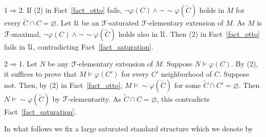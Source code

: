 \documentclass{amsproc}
\makeatletter
\newcommand{\mylabel}[1]{{#1}\hfill}
\renewenvironment{itemize}
  {\begin{list}{$\triangleright$}{%
  \setlength{\parskip}{0mm}
  \setlength{\topsep}{.1\baselineskip}
  \setlength{\rightmargin}{0mm}
  \setlength{\listparindent}{0mm}
  \setlength{\itemindent}{0mm}
  \setlength{\labelwidth}{3ex}
  \setlength{\itemsep}{.1\baselineskip}
  \setlength{\parsep}{.1\baselineskip}
  \setlength{\partopsep}{0mm}
  \setlength{\labelsep}{1ex}
  \setlength{\leftmargin}{\labelwidth+\labelsep}
  \let\makelabel\mylabel}}{%
\end{list}}
\newcounter{thm}
\theoremstyle{mio}
\newtheorem{fact}[thm]{Fact}\tcolorboxenvironment{fact}{mythm}
\providecommand{\proofNameStyle}{\bfseries}
\renewenvironment{proof}[1][\proofname]{\par
  \pushQED{\qed}%
  \normalfont%
  \trivlist
  \item[\hskip\labelsep
        \proofNameStyle
    #1\@addpunct{.}]\ignorespaces
}{%
  \popQED\endtrivlist\@endpefalse
}
\renewcommand*{\emph}[1]{%
   \smash{\tikz[baseline]\node[rectangle, fill=teal!25, rounded corners, inner xsep=0.5ex, inner ysep=0.2ex, anchor=base, minimum height = 2.7ex]{\strut #1};}}
\makeatother
\begin{document}
\begin{proof}
  1$\Rightarrow$2.
  If (2) in Fact~\ref{fact_otto} fails, $\neg\varphi(C)\wedge\neg\,{\sim}\varphi(\tilde C)$ holds in $M$ for every $\tilde C\cap C=\varnothing$.
  Let ${\EuScript U}$ be an ${\EuScript F}$-saturated ${\EuScript F}$-elementary extension of $M$.
  As $M$ is ${\EuScript F}$-maximal, $\neg\varphi(C)\wedge\neg\,{\sim}\varphi(\tilde C)$ holds also in ${\EuScript U}$.
  Then (2) in Fact~\ref{fact_otto} fails in ${\EuScript U}$, contradicting Fact~\ref{fact_saturation}.

  2$\Rightarrow$1. 
  Let $N$ be any ${\EuScript F}$-elementary extension of $M$.
  Suppose $N\models\varphi(C)$.
  By (2), it suffices to prove that $M\models\varphi(C')$ for every $C'$ neighborhood of $C$.
  Suppose not. Then, by (2) in Fact~\ref{fact_otto}, $M\models{\sim}\varphi(\tilde C)$ for some $\tilde C\cap C'=\varnothing$.
  Then $N\models{\sim}\varphi(\tilde C)$ by ${\EuScript F}$-elementarity.
  As $\tilde C\cap C=\varnothing$, this contradicts Fact~\ref{fact_saturation}.
\end{proof}

In what follows we fix a large saturated standard structure which we denote by \emph{${\EuScript U}$.}






    
\end{document}

